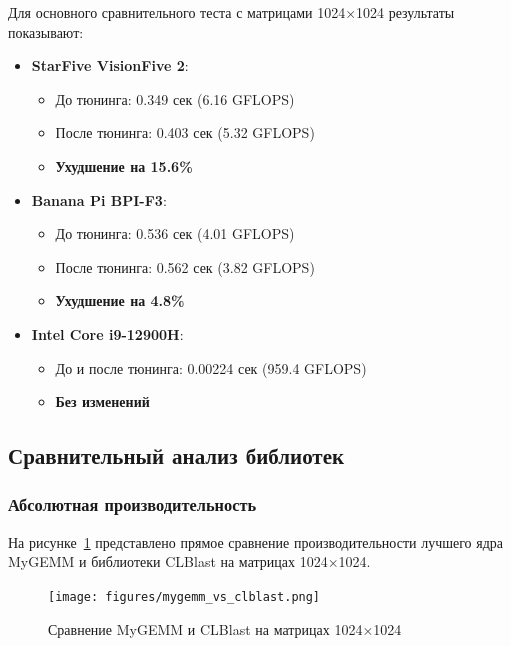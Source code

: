 Для основного сравнительного теста с матрицами 1024×1024 результаты показывают:

\begin{itemize}
    \item \textbf{StarFive VisionFive 2}:
    \begin{itemize}
        \item До тюнинга: 0.349 сек (6.16 GFLOPS)
        \item После тюнинга: 0.403 сек (5.32 GFLOPS) 
        \item \textbf{Ухудшение на 15.6\%}
    \end{itemize}
    
    \item \textbf{Banana Pi BPI-F3}:
    \begin{itemize}
        \item До тюнинга: 0.536 сек (4.01 GFLOPS)
        \item После тюнинга: 0.562 сек (3.82 GFLOPS)
        \item \textbf{Ухудшение на 4.8\%}
    \end{itemize}
    
    \item \textbf{Intel Core i9-12900H}:
    \begin{itemize}
        \item До и после тюнинга: 0.00224 сек (959.4 GFLOPS) 
        \item \textbf{Без изменений}
    \end{itemize}
\end{itemize}

\subsection{Сравнительный анализ библиотек}

\subsubsection{Абсолютная производительность}

На рисунке~\ref{fig:clblast_vs_mygemm} представлено прямое сравнение производительности лучшего ядра MyGEMM и библиотеки CLBlast на матрицах 1024×1024.

\begin{figure}[h!]
\centering
\texttt{[image: figures/mygemm\_vs\_clblast.png]}
\caption{Сравнение MyGEMM и CLBlast на матрицах 1024×1024}
\label{fig:clblast_vs_mygemm}
\end{figure}

